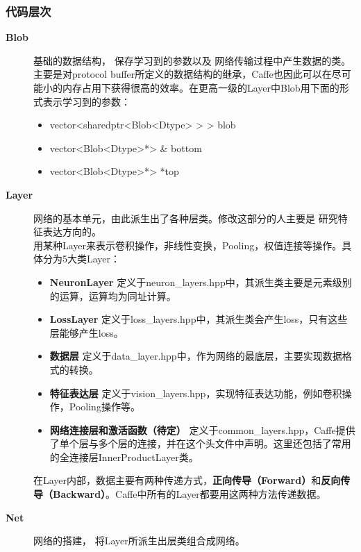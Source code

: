 \subsubsection{代码层次}
\begin{description}
\item[\textbf{Blob}] 基础的数据结构，{\color{blue} 保存学习到的参数}以及{\color{blue} 网络传输过程中产生数据的类}。\\
	主要是对protocol buffer所定义的数据结构的继承，Caffe也因此可以在尽可能小的内存占用下获得很高的效率。在更高一级的Layer中Blob用下面的形式表示学习到的参数：
	\begin{itemize}
	\item vector<sharedptr<Blob<Dtype> > > blob
	\item vector<Blob<Dtype>*> \& bottom
	\item vector<Blob<Dtype>*> *top
	\end{itemize}
\item[\textbf{Layer}] 网络的基本单元，由此派生出了各种层类。修改这部分的人主要是{\color{blue} 研究特征表达}方向的。\\
	用某种Layer来表示卷积操作，非线性变换，Pooling，权值连接等操作。具体分为5大类Layer：
	\begin{itemize}
	\item \textbf{NeuronLayer} \hspace{0.1in} 定义于neuron\_layers.hpp中，其派生类主要是元素级别的运算，运算均为同址计算。
	\item \textbf{LossLayer} \hspace{0.1in} 定义于loss\_layers.hpp中，其派生类会产生loss，只有这些层能够产生loss。
	\item \textbf{数据层} \hspace{0.1in} 定义于data\_layer.hpp中，作为网络的最底层，主要实现数据格式的转换。
	\item \textbf{特征表达层} \hspace{0.1in} 定义于vision\_layers.hpp，实现特征表达功能，例如卷积操作，Pooling操作等。
	\item \textbf{网络连接层和激活函数（待定）} \hspace{0.1in} 定义于common\_layers.hpp，Caffe提供了单个层与多个层的连接，并在这个头文件中声明。这里还包括了常用的全连接层InnerProductLayer类。
	\end{itemize}
	在Layer内部，数据主要有两种传递方式，\textbf{正向传导（Forward）}和\textbf{反向传导（Backward）}。Caffe中所有的Layer都要用这两种方法传递数据。
\item[\textbf{Net}] 网络的搭建，{\color{blue} 将Layer所派生出层类组合成网络}。\\

\end{description}
